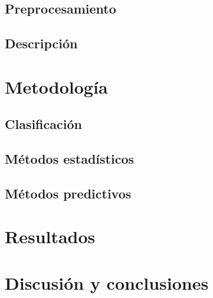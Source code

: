 \documentclass[colorinlistoftodos]{article}
\begin{document}
\subsection{Preprocesamiento}

\subsection{Descripción}


\section{Metodología}
\subsection{Clasificación}
\subsection{Métodos estadísticos}
\subsection{Métodos predictivos}




\section{Resultados}

\section{Discusión y conclusiones}




\listoftodos%
\end{document}
